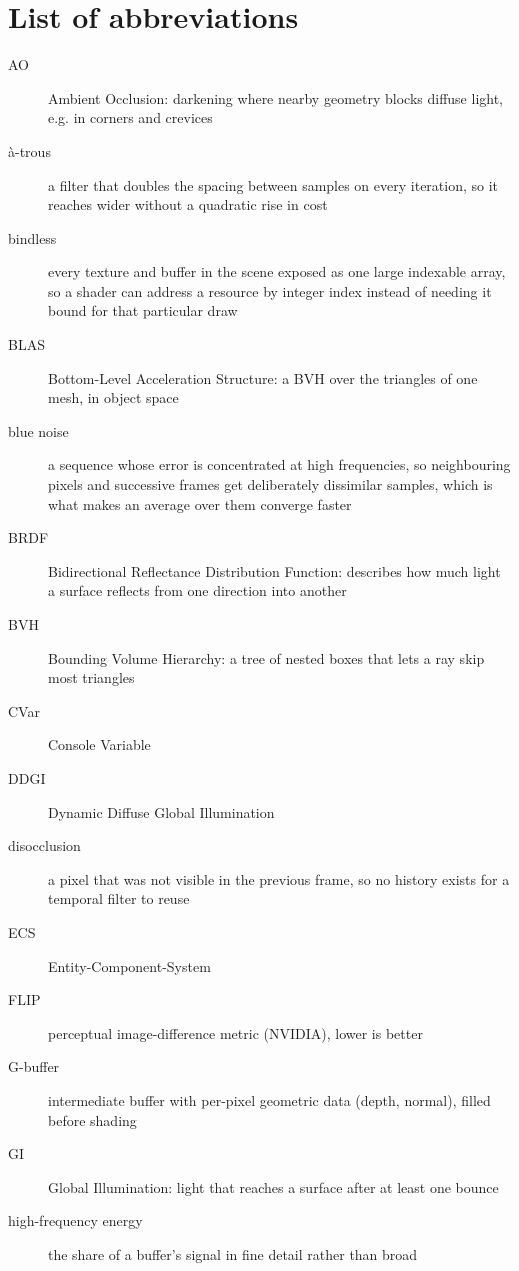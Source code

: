 \chapter*{List of abbreviations}

\begin{description}
  \item[AO] Ambient Occlusion: darkening where nearby geometry blocks diffuse light, e.g. in
    corners and crevices
  \item[\`a-trous] a filter that doubles the spacing between samples on every iteration, so it
    reaches wider without a quadratic rise in cost
  \item[bindless] every texture and buffer in the scene exposed as one large indexable array, so a
    shader can address a resource by integer index instead of needing it bound for that particular
    draw
  \item[BLAS] Bottom-Level Acceleration Structure: a BVH over the triangles of one mesh, in object
    space
  \item[blue noise] a sequence whose error is concentrated at high frequencies, so neighbouring
    pixels and successive frames get deliberately dissimilar samples, which is what makes an average
    over them converge faster
  \item[BRDF] Bidirectional Reflectance Distribution Function: describes how much light a surface
    reflects from one direction into another
  \item[BVH] Bounding Volume Hierarchy: a tree of nested boxes that lets a ray skip most triangles
  \item[CVar] Console Variable
  \item[DDGI] Dynamic Diffuse Global Illumination
  \item[disocclusion] a pixel that was not visible in the previous frame, so no history exists for a
    temporal filter to reuse
  \item[ECS] Entity-Component-System
  \item[FLIP] perceptual image-difference metric (NVIDIA), lower is better
  \item[G-buffer] intermediate buffer with per-pixel geometric data (depth, normal), filled before
    shading
  \item[GI] Global Illumination: light that reaches a surface after at least one bounce
  \item[high-frequency energy] the share of a buffer's signal in fine detail rather than broad

\end{description}
